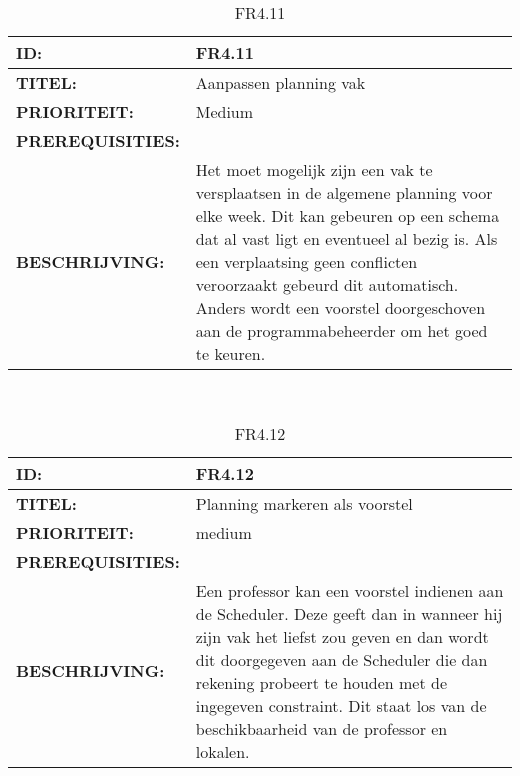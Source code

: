 \noindent\begin{table}[h]
            \begin{tabular}{l | p{10cm}}
                \textbf{ID:} & FR4.11 \\ \hline
                \textbf{TITEL:} & Aanpassen planning vak\\ \hline
                \textbf{PRIORITEIT:} &  Medium \\ \hline
                \textbf{PREREQUISITIES:} & \\ \hline
                \textbf{BESCHRIJVING:} & Het moet mogelijk  zijn een vak te versplaatsen in de algemene planning voor elke week. Dit kan gebeuren op een schema dat al vast ligt en eventueel al bezig is. Als een verplaatsing geen conflicten veroorzaakt gebeurd dit automatisch. Anders wordt een voorstel doorgeschoven aan de programmabeheerder om het goed te keuren.\\
            \end{tabular}\\
            \caption{FR4.11}
            \label{tab:mysixteenthtable}
        \end{table}
        
\noindent\begin{table}[h]
            \begin{tabular}{l | p{10cm}}
                \textbf{ID:} & FR4.12 \\ \hline
                \textbf{TITEL:} & Planning markeren als voorstel\\ \hline
                \textbf{PRIORITEIT:} &  medium \\ \hline
                \textbf{PREREQUISITIES:} & \\ \hline
                \textbf{BESCHRIJVING:} & Een professor kan een voorstel indienen aan de Scheduler. 
                                        Deze geeft dan in wanneer hij zijn vak het liefst zou geven en dan wordt dit doorgegeven aan de Scheduler die dan rekening probeert te houden met de ingegeven constraint. Dit staat los van de beschikbaarheid van de professor en lokalen.  \\
            \end{tabular}\\
            \caption{FR4.12}
            \label{tab:mysixteenthtable}
        \end{table}
        
\clearpage
        